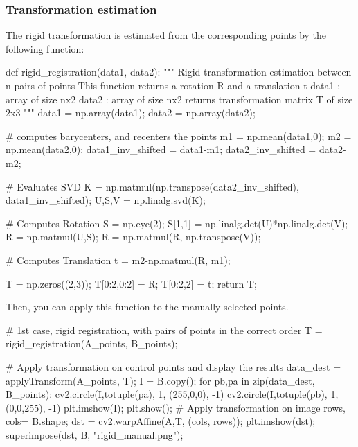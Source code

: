 \subsubsection{Transformation estimation}
The rigid transformation is estimated from the corresponding points by the following function:
\begin{python}
def rigid_registration(data1, data2):
    """
    Rigid transformation estimation between n pairs of points
    This function returns a rotation R and a translation t
    data1 : array of size nx2
    data2 : array of size nx2
    returns transformation matrix T of size 2x3
    """
    data1 = np.array(data1);
    data2 = np.array(data2);

    # computes barycenters, and recenters the points
    m1 = np.mean(data1,0);
    m2 = np.mean(data2,0);
    data1_inv_shifted = data1-m1;
    data2_inv_shifted = data2-m2;

    # Evaluates SVD
    K = np.matmul(np.transpose(data2_inv_shifted), data1_inv_shifted);
    U,S,V = np.linalg.svd(K);

    # Computes Rotation
    S = np.eye(2);
    S[1,1] = np.linalg.det(U)*np.linalg.det(V);
    R = np.matmul(U,S);
    R = np.matmul(R, np.transpose(V));

    # Computes Translation
    t = m2-np.matmul(R, m1);
    
    T = np.zeros((2,3));
    T[0:2,0:2] = R;
    T[0:2,2] = t;
    return T;
\end{python}
\smallskip
Then, you can apply this function to the manually selected points.
\smallskip
\begin{python}
# 1st case, rigid registration, with pairs of points in the correct order
T = rigid_registration(A_points, B_points);

# Apply transformation on control points and display the results
data_dest = applyTransform(A_points, T);
I = B.copy();
for pb,pa in zip(data_dest, B_points):
    cv2.circle(I,totuple(pa), 1, (255,0,0), -1)    
    cv2.circle(I,totuple(pb), 1, (0,0,255), -1)   
plt.imshow(I);
plt.show();
# Apply transformation on image
rows, cols= B.shape;
dst = cv2.warpAffine(A,T, (cols, rows));
plt.imshow(dst);
superimpose(dst, B, "rigid_manual.png");
\end{python}

